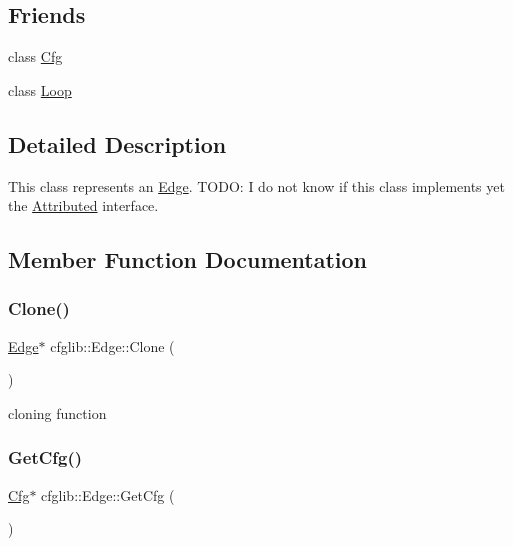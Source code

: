 \subsection*{Friends}
\begin{DoxyCompactItemize}
\item 
class \hyperlink{classcfglib_1_1Edge_aad28e913031e836a51d46ca3a1a3b68b}{Cfg}
\item 
class \hyperlink{classcfglib_1_1Edge_a6f7095d721dd1dbd490d97c028eb676f}{Loop}
\end{DoxyCompactItemize}


\subsection{Detailed Description}
This class represents an \hyperlink{classcfglib_1_1Edge}{Edge}. T\+O\+DO\+: I do not know if this class implements yet the {\ttfamily \hyperlink{classcfglib_1_1Attributed}{Attributed}} interface. 

\subsection{Member Function Documentation}
\mbox{\label{classcfglib_1_1Edge_a63c1a3697beb4b1734455c92d647f04c}} 
\subsubsection{\texorpdfstring{Clone()}{Clone()}}
{\footnotesize\ttfamily \hyperlink{classcfglib_1_1Edge}{Edge}$\ast$ cfglib\+::\+Edge\+::\+Clone (\begin{DoxyParamCaption}\item[{\hyperlink{classcfglib_1_1CloneHandle}{Clone\+Handle} \&}]{ }\end{DoxyParamCaption})}

cloning function \mbox{\label{classcfglib_1_1Edge_ae1359932ba4c4d3e5e20c0391561e6a8}} 
\subsubsection{\texorpdfstring{Get\+Cfg()}{GetCfg()}}
{\footnotesize\ttfamily \hyperlink{classcfglib_1_1Cfg}{Cfg}$\ast$ cfglib\+::\+Edge\+::\+Get\+Cfg (\begin{DoxyParamCaption}{ }\end{DoxyParamCaption})}

